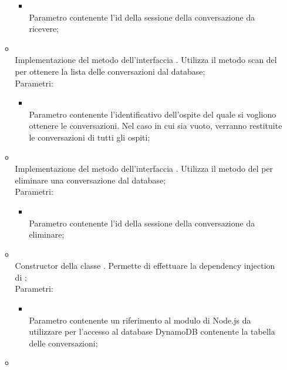 \begin{itemize}
\begin{itemize}
\begin{itemize}
			\item {} \\
			Parametro contenente l'id della sessione della conversazione da ricevere;
		\end{itemize}
		\item[]  \\
		Implementazione del metodo dell'interfaccia . Utilizza il metodo scan del  per ottenere la lista delle conversazioni dal database;\\
		Parametri:
		\begin{itemize}
			\item {} \\
			Parametro contenente l'identificativo dell'ospite del quale si vogliono ottenere le conversazioni. Nel caso in cui sia vuoto, verranno restituite le conversazioni di tutti gli ospiti;
		\end{itemize}
		\item[]  \\
		Implementazione del metodo dell'interfaccia . Utilizza il metodo  del  per eliminare una conversazione dal database;\\
		Parametri:
		\begin{itemize}
			\item {} \\
			Parametro contenente l'id della sessione della conversazione da eliminare;
		\end{itemize}
		\item[]  \\
		Constructor della classe . Permette di effettuare la dependency injection di ;\\
		Parametri:
		\begin{itemize}
			\item {} \\
			Parametro contenente un riferimento al modulo di Node.js da utilizzare per l'accesso al database DynamoDB contenente la tabella delle conversazioni;
		\end{itemize}
		\item[]  \\

\end{itemize}
\end{itemize}
